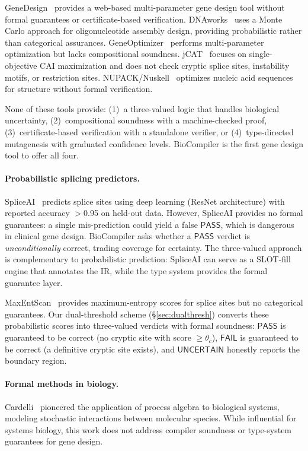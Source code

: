 \documentclass[acmsmall,review,anonymous]{acmart}
\newcommand{\PASS}{\ensuremath{\mathsf{PASS}}\xspace}
\newcommand{\FAIL}{\ensuremath{\mathsf{FAIL}}\xspace}
\newcommand{\UNCERTAIN}{\ensuremath{\mathsf{UNCERTAIN}}\xspace}
\begin{document}
GeneDesign~\cite{richardson2006genedesign} provides a web-based
multi-parameter gene design tool without formal guarantees or
certificate-based verification.  DNAworks~\cite{vandenbergh2015dnaworks}
uses a Monte Carlo approach for oligonucleotide assembly design,
providing probabilistic rather than categorical assurances.
GeneOptimizer~\cite{fath2011geneoptimizer} performs multi-parameter
optimization but lacks compositional soundness.
jCAT~\cite{gage2006jcat} focuses on single-objective CAI maximization
and does not check cryptic splice sites, instability motifs, or
restriction sites.  NUPACK/Nuskell~\cite{zadeh2011nupack} optimizes
nucleic acid sequences for structure without formal verification.

None of these tools provide: (1)~a three-valued logic that handles
biological uncertainty, (2)~compositional soundness with a machine-checked
proof, (3)~certificate-based verification with a standalone verifier, or
(4)~type-directed mutagenesis with graduated confidence levels.
BioCompiler is the first gene design tool to offer all four.

\paragraph{Probabilistic splicing predictors.}
SpliceAI~\cite{jaganathan2019spliceai} predicts splice sites using deep
learning (ResNet architecture) with reported accuracy $>$0.95 on held-out
data.  However, SpliceAI provides no formal guarantees: a single
mis-prediction could yield a false \PASS, which is dangerous in clinical
gene design.  BioCompiler asks whether a \PASS{} verdict is
\emph{unconditionally} correct, trading coverage for certainty.  The
three-valued approach is complementary to probabilistic prediction:
SpliceAI can serve as a SLOT-fill engine that annotates the IR, while
the type system provides the formal guarantee layer.

MaxEntScan~\cite{yarden2006maxentscan} provides maximum-entropy scores
for splice sites but no categorical guarantees.  Our dual-threshold
scheme (\S\ref{sec:dualthresh}) converts these probabilistic scores into
three-valued verdicts with formal soundness: \PASS{} is guaranteed to be
correct (no cryptic site with score $\ge \theta_c$), \FAIL{} is
guaranteed to be correct (a definitive cryptic site exists), and
\UNCERTAIN{} honestly reports the boundary region.

\paragraph{Formal methods in biology.}
Cardelli~\cite{cardelli2008process} pioneered the application of process
algebra to biological systems, modeling stochastic interactions between
molecular species.  While influential for systems biology, this work does
not address compiler soundness or type-system guarantees for gene design.
\end{document}
